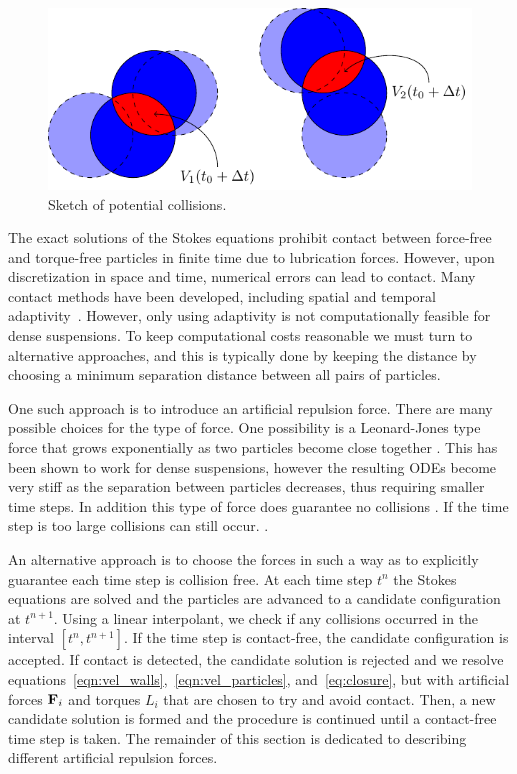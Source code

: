 \documentclass[preprint, 10pt]{elsarticle}
\begin{document}
\begin{figure}[!h]\label{fig:collision_sketch}
\begin{center}
\includegraphics{figures/collisions.pdf}
\end{center}
\caption{Sketch of potential collisions.}
\end{figure}
The exact solutions of the Stokes equations prohibit contact between
force-free and torque-free particles in finite time due to lubrication
forces.  However, upon discretization in space and time, numerical
errors can lead to contact.  Many contact methods have been developed,
including spatial and temporal adaptivity~\cite{Kropinski1999}.
However, only using adaptivity is not computationally feasible for dense
suspensions.  To keep computational costs reasonable we must turn to
alternative approaches, and this is typically done by keeping the
distance by choosing a minimum separation distance between all pairs of
particles. 

One such approach is to introduce an artificial repulsion force. There
are many possible choices for the type of force. One possibility is a
Leonard-Jones type force that grows exponentially
 as two particles become close together
. This has been shown to work for dense
suspensions, however the resulting ODEs become very stiff as the
separation between particles decreases, thus requiring smaller time
steps. In addition this type of force does guarantee no collisions
. If
the time step is too large collisions can still occur.
.

An alternative approach is to choose the forces in such a way as to
explicitly guarantee each time step is collision free.  At each time
step $t^n$ the Stokes equations are solved and the particles are
advanced to a candidate configuration at $t^{n+1}$.  Using a linear
interpolant, we check if any collisions occurred in the interval
$[t^n,t^{n+1}]$.  If the time step is contact-free, the candidate
configuration is accepted.  If contact is detected, the candidate
solution is rejected and we resolve
equations~\eqref{eqn:vel_walls},~\eqref{eqn:vel_particles},
and~\eqref{eq:closure}, but with artificial forces ${\mathbf{F}}_i$ and torques
$L_i$ that are chosen to try and avoid contact.  Then, a new candidate
solution is formed and the procedure is continued until a contact-free
time step is taken.  The remainder of this section is dedicated to
describing different artificial repulsion forces.
\end{document}
